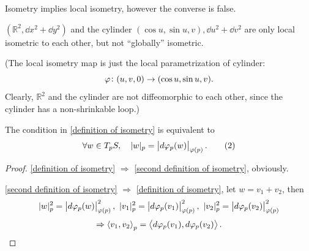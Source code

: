 \begin{remark}
    Isometry implies local isometry, however the converse is false.
\end{remark}
\begin{example}
    \(\left(\mathbb{R}^2,\dd x^2 +\dd y^2\right)\) and the cylinder 
    \((\cos u,\sin u,v), \dd u^2+\dd v^2\) are only local isometric
     to each other, but not ``globally'' isometric.

    (The local isometry map is just the local parametrization
    of cylinder:
    \[
        \varphi\colon (u,v,0)\to (\cos u,\sin u,v).    
    \]
    Clearly, \(\mathbb{R}^2\) and the cylinder are not diffeomorphic
    to each other, since the cylinder has a non-shrinkable loop.)
\end{example}
\begin{exercise}
    The condition in \cref{definition of isometry} is equivalent to 
    \[
        \forall w\in T_p S, \quad |w|_p=\left|d \varphi_p(w)
        \right|_{\varphi(p)}.\tag{2}\label{second definition of isometry}
    \]
\end{exercise}
\begin{proof}
    \cref{definition of isometry} \(\Rightarrow\)
     \cref{second definition of isometry}, obviously.

     \cref{second definition of isometry}
     \(\Rightarrow\) \cref{definition of isometry}, 
     let  \(w=v_1+v_2\), then 
     \[
        |w|_p^2=\left|d \varphi_p(w)
        \right|_{\varphi(p)}^2,~
        |v_1|_p^2=\left|d \varphi_p(v_1)
        \right|_{\varphi(p)}^2,~ 
        |v_2|_p^2=\left|d \varphi_p(v_2)
        \right|_{\varphi(p)}^2
     \]
     \[\Rightarrow
        \left\langle v_1,v_2\right\rangle_p=
        \left\langle d\varphi_p(v_1),d\varphi_p(v_2)\right\rangle.
     \]
\end{proof}
